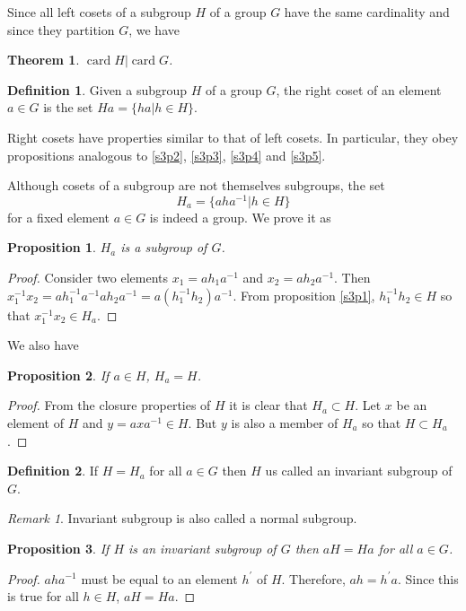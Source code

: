\documentclass{article}
\DeclareMathOperator{\card}{card}
\theoremstyle{plain}
\newtheorem{thm}{Theorem}
\numberwithin{thm}{section}
\theoremstyle{plain}
\newtheorem{prop}{Proposition}
\numberwithin{prop}{section}
\theoremstyle{definition}
\newtheorem{defn}{Definition}
\numberwithin{defn}{section}
\theoremstyle{remark}
\newtheorem*{rem}{Remark}
\numberwithin{equation}{section}
\begin{document}
Since all left cosets of a subgroup $H$ of a group $G$ have the same cardinality
and since they partition $G$, we have
\begin{thm}\label{s3t1}
$\card H | \card G$.
\end{thm}

\begin{defn}\label{s3d3}
Given a subgroup $H$ of a group $G$, the right coset of an element $a \in G$
is the set $Ha = \{ha | h \in H\}$.
\end{defn}

Right cosets have properties similar to that of left cosets. In particular,
they obey propositions analogous to \ref{s3p2}, \ref{s3p3}, \ref{s3p4} and
\ref{s3p5}.

Although cosets of a subgroup are not themselves subgroups, the set
\begin{equation}\label{s3e1}
H_a = \{aha^{-1} | h \in H\}
\end{equation}
for a fixed element $a \in G$ is indeed a group. We prove it as 
\begin{prop}\label{s3p6}
$H_a$ is a subgroup of $G$.
\end{prop}
\begin{proof}
Consider two elements $x_1 = ah_1a^{-1}$ and $x_2 = ah_2a^{-1}$. Then $x_1^{-1}
x_2 = ah_1^{-1}a^{-1}ah_2 a^{-1} = a(h_1^{-1}h_2) a^{-1}$. From proposition
\ref{s3p1}, $h_1^{-1}h_2 \in H$ so that $x_1^{-1}x_2 \in H_a$.
\end{proof}

We also have
\begin{prop}\label{s3e7}
If $a \in H$, $H_a = H$.
\end{prop}
\begin{proof}
From the closure properties of $H$ it is clear that $H_a \subset H$. Let $x$
be an element of $H$ and $y = axa^{-1} \in H$. But $y$ is also a member of
$H_a$ so that $H \subset H_a$.
\end{proof}

\begin{defn}\label{s3d4}
If $H = H_a$ for all $a \in G$ then $H$ us called an invariant subgroup of $G$.
\end{defn}

\begin{rem}
Invariant subgroup is also called a normal subgroup.
\end{rem}

\begin{prop}\label{s3e8}
If $H$ is an invariant subgroup of $G$ then $aH = Ha$ for all $a \in G$.
\end{prop}
\begin{proof}
$aha^{-1}$ must be equal to an element $h^\prime$ of $H$. Therefore, $ah =
h^\prime a$. Since this is true for all $h \in H$, $aH = Ha$.
\end{proof}
\end{document}
